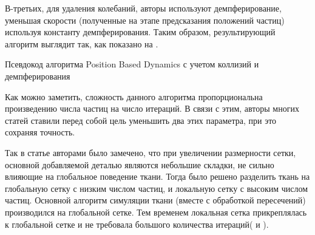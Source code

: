 	В-третьих, для удаления колебаний, авторы используют демпферирование, уменьшая скорости (полученные на этапе предсказания положений частиц) используя константу демпферирования. Таким образом, результирующий алгоритм выглядит так, как показано на .
	
	\begin{algorithm} %
		\nonl{}
		\caption{Псевдокод алгоритма Position Based Dynamics с учетом коллизий и демпферирования}\label{alg:PositionBasedDynamics2}
	\end{algorithm}
	\FloatBarrier
	
	Как можно заметить, сложность данного алгоритма пропорциональна произведению числа частиц на число итераций. В связи с этим, авторы многих статей ставили перед собой цель уменьшить два этих параметра, при это сохраняя точность.
	
	Так в статье \cite{muller2010wrinkle} авторами было замечено, что при увеличении размерности сетки, основной добавляемой деталью являются небольшие складки, не сильно влияющие на глобальное поведение ткани. Тогда было решено разделить ткань на глобальную сетку с низким числом частиц, и локальную сетку с высоким числом частиц. Основной алгоритм симуляции ткани (вместе с обработкой пересечений) производился на глобальной сетке. Тем временем локальная сетка прикреплялась к глобальной сетке и не требовала большого количества итераций( и ).
	\newpage
	
